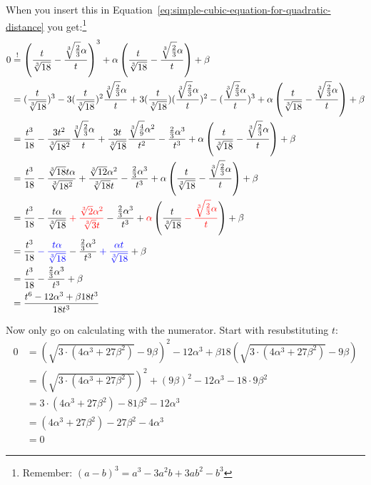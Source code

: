 \documentclass[a4paper]{scrartcl}
\theoremstyle{break}
\theoremstyle{nonumberplain}
\begin{document}
When you insert this in Equation~\ref{eq:simple-cubic-equation-for-quadratic-distance}
you get:\footnote{Remember: $(a-b)^3 = a^3-3 a^2 b+3 a b^2-b^3$}
\allowdisplaybreaks
\begin{align}
    0 &\stackrel{!}{=} \left (\frac{t}{\sqrt[3]{18}} - \frac{\sqrt[3]{\frac{2}{3}} \alpha }{t} \right )^3 + \alpha \left (\frac{t}{\sqrt[3]{18}} - \frac{\sqrt[3]{\frac{2}{3}} \alpha }{t} \right ) + \beta\\
&= (\frac{t}{\sqrt[3]{18}})^3 
    - 3 (\frac{t}{\sqrt[3]{18}})^2 \frac{\sqrt[3]{\frac{2}{3}} \alpha }{t} 
    + 3 (\frac{t}{\sqrt[3]{18}})(\frac{\sqrt[3]{\frac{2}{3}} \alpha }{t})^2 
    - (\frac{\sqrt[3]{\frac{2}{3}} \alpha }{t})^3 
    + \alpha \left (\frac{t}{\sqrt[3]{18}} - \frac{\sqrt[3]{\frac{2}{3}} \alpha }{t} \right ) + \beta\\
&= \frac{t^3}{18}             
    - \frac{3t^2}{\sqrt[3]{18^2}} \frac{\sqrt[3]{\frac{2}{3}} \alpha }{t}
    + \frac{3t}{\sqrt[3]{18}} \frac{\sqrt[3]{\frac{4}{9}} \alpha^2 }{t^2} 
    - \frac{\frac{2}{3} \alpha^3 }{t^3} 
    + \alpha \left (\frac{t}{\sqrt[3]{18}} - \frac{\sqrt[3]{\frac{2}{3}} \alpha }{t} \right ) + \beta\\
&= \frac{t^3}{18}
    - \frac{\sqrt[3]{18} t \alpha}{\sqrt[3]{18^2}}
    + \frac{\sqrt[3]{12} \alpha^2}{\sqrt[3]{18} t}  
    - \frac{\frac{2}{3} \alpha^3 }{t^3} 
    + \alpha \left (\frac{t}{\sqrt[3]{18}} - \frac{\sqrt[3]{\frac{2}{3}} \alpha }{t} \right ) + \beta\\
&= \frac{t^3}{18} 
    - \frac{t \alpha}{\sqrt[3]{18}} 
    \color{red}+ \frac{\sqrt[3]{2} \alpha^2}{\sqrt[3]{3} t} \color{black}
    - \frac{\frac{2}{3} \alpha^3 }{t^3} 
    + \color{red}\alpha \color{black} \left (\frac{t}{\sqrt[3]{18}}  \color{red}- \frac{\sqrt[3]{\frac{2}{3}} \alpha }{t} \color{black}\right ) 
    + \beta\\
&= \frac{t^3}{18} \color{blue}- \frac{t \alpha}{\sqrt[3]{18}} \color{black} 
    - \frac{\frac{2}{3} \alpha^3 }{t^3} 
    \color{blue}+ \frac{\alpha t}{\sqrt[3]{18}} \color{black} 
    + \beta\\
&= \frac{t^3}{18} - \frac{\frac{2}{3} \alpha^3 }{t^3} + \beta\\
&= \frac{t^6 - 12 \alpha^3 + \beta 18 t^3}{18t^3}
\end{align}

Now only go on calculating with the numerator. Start with resubstituting
$t$:
\begin{align}
0 &= (\sqrt{3 \cdot (4 \alpha^3 + 27 \beta^2)} -9\beta)^2 - 12 \alpha^3 + \beta 18 (\sqrt{3 \cdot (4 \alpha^3 + 27 \beta^2)} -9\beta)\\
&= (\sqrt{3 \cdot (4 \alpha^3 + 27 \beta^2)})^2 +(9\beta)^2 - 12 \alpha^3 -18\cdot 9\beta^2\\
&= 3 \cdot (4 \alpha^3 + 27 \beta^2) -81 \beta^2 - 12 \alpha^3\\
&= (4 \alpha^3 + 27 \beta^2) -27 \beta^2 - 4 \alpha^3\\
&= 0
\end{align}
\end{document}
